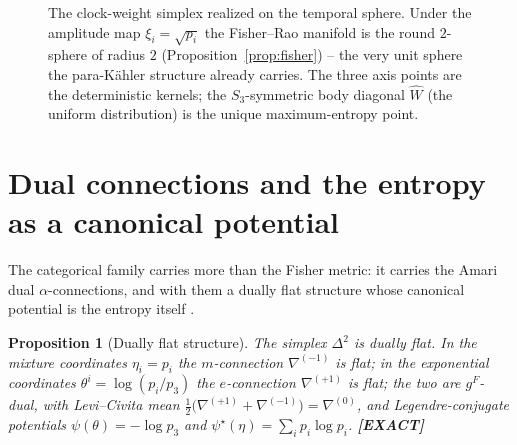 \documentclass[11pt,oneside]{book}
\newcommand{\Wh}{\hat{W}}                         %
\newcommand{\status}[1]{{\sffamily\bfseries\color{statuscol}[#1]}}
\theoremstyle{plain}
\newtheorem{proposition}[theorem]{Proposition}
\theoremstyle{definition}
\theoremstyle{remark}
\begin{document}
\begin{figure}[t]
\centering
{}
\caption{The clock-weight simplex realized on the temporal sphere. Under the
amplitude map $\xi_i=\sqrt{p_i}$ the Fisher--Rao manifold is the round $2$-sphere of
radius $2$ (Proposition~\ref{prop:fisher}) -- the very unit sphere the para-K\"ahler
structure already carries. The three axis points are the deterministic kernels; the
$S_3$-symmetric body diagonal $\Wh$ (the uniform distribution) is the unique
maximum-entropy point.}
\label{fig:stat-sphere}
\end{figure}

\section{Dual connections and the entropy as a canonical potential}
\label{sec:dually-flat}

The categorical family carries more than the Fisher metric: it carries the Amari
dual $\alpha$-connections, and with them a dually flat structure whose canonical
potential is the entropy itself \cite{Amari1985,AmariNagaoka2000}.

\begin{proposition}[Dually flat structure]
\label{prop:dually-flat}
The simplex $\Delta^2$ is dually flat. In the mixture coordinates $\eta_i=p_i$ the
$m$-connection $\nabla^{(-1)}$ is flat; in the exponential coordinates
$\theta^i=\log(p_i/p_3)$ the $e$-connection $\nabla^{(+1)}$ is flat; the two are
$g^F$-dual, with Levi--Civita mean
$\tfrac12\bigl(\nabla^{(+1)}+\nabla^{(-1)}\bigr)=\nabla^{(0)}$, and Legendre-conjugate
potentials $\psi(\theta)=-\log p_3$ and $\psi^\star(\eta)=\sum_i p_i\log p_i$.
\status{EXACT}
\end{proposition}
\end{document}
